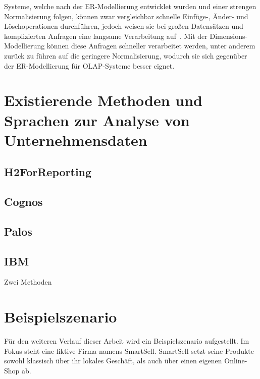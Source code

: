 \documentclass[
  language=german, %
  type=bachelor%
]{isthesis}
\begin{document}
\begin{content}
  Systeme, welche nach der ER-Modellierung entwicklet wurden und einer strengen
  Normalisierung folgen, können zwar vergleichbar schnelle Einfüge-, Änder- und
  Löschoperationen durchführen, jedoch weisen sie bei großen Datensätzen und
  komplizierten Anfragen eine langsame Verarbeitung auf~\cite[][S.
  52]{ballard2012dimensional}. Mit der Dimensions-Modellierung können diese
  Anfragen schneller verarbeitet werden\cite[][S.  52]{ballard2012dimensional},
  unter anderem zurück zu führen auf die geringere Normalisierung, wodurch sie
  sich gegenüber der ER-Modellierung für \acrshort{OLAP}-Systeme besser eignet.



  \section{Existierende Methoden und Sprachen zur Analyse von Unternehmensdaten}

  \subsection{H2ForReporting}
  \subsection{Cognos}
  \subsection{Palos}

  \subsection{IBM}
  \begin{figure}[caption={Metamodell der IBM-Dimension-Sprache}, label={fig:img01}]
    \resizebox{\columnwidth}{!}{}
  \end{figure}
  Zwei Methoden



  \section{Beispielszenario}
  Für den weiteren Verlauf dieser Arbeit wird ein Beispielszenario aufgestellt. Im
  Fokus steht eine fiktive Firma namens SmartSell. SmartSell setzt seine
  Produkte sowohl klassisch über ihr lokales Geschäft, als auch über einen
  eigenen Online-Shop ab.


\end{content}
\end{document}
